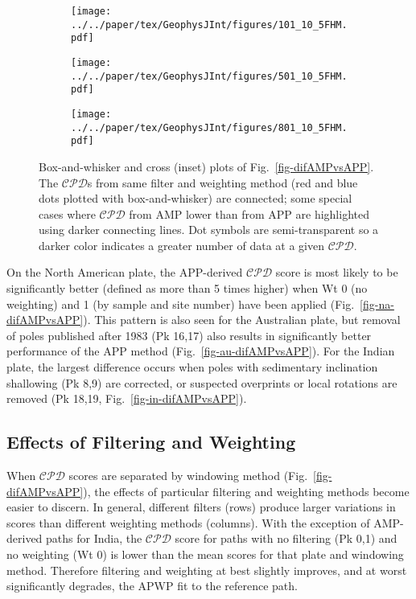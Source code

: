 \begin{figure}
	\centering
	\begin{subfigure}{.9\textwidth}
		\texttt{[image: ../../paper/tex/GeophysJInt/figures/101\_10\_5FHM.pdf]}
		\caption{}\label{fig-na-boxAMPvsAPP}
	\end{subfigure}
	\vspace{.1em}
	\begin{subfigure}{.9\textwidth}
		\texttt{[image: ../../paper/tex/GeophysJInt/figures/501\_10\_5FHM.pdf]}
		\caption{}\label{fig-in-boxAMPvsAPP}
	\end{subfigure}
	\vspace{.1em}
	\begin{subfigure}{.9\textwidth}
		\texttt{[image: ../../paper/tex/GeophysJInt/figures/801\_10\_5FHM.pdf]}
		\caption{}\label{fig-au-boxAMPvsAPP}
	\end{subfigure}
	\caption[]{Box-and-whisker and cross (inset) plots of
Fig.~\ref{fig-difAMPvsAPP}. The $\mathcal{CPD}$s from same filter and weighting
method (red and blue dots plotted with box-and-whisker) are connected; some
special cases where $\mathcal{CPD}$ from AMP lower than from APP are highlighted
using darker connecting lines. Dot symbols are semi-transparent so a darker
color indicates a greater number of data at a given
$\mathcal{CPD}$.}\label{fig-boxAMPvsAPP}
\end{figure}

On the North American plate, the APP-derived $\mathcal{CPD}$ score is most
likely to be significantly better (defined as more than 5 times higher) when
Wt 0 (no weighting) and 1 (by sample and site number) have been
applied (Fig.~\ref{fig-na-difAMPvsAPP}). This pattern is also seen for the
Australian plate, but removal of poles published after 1983 (Pk 16,17) also
results in significantly better performance of the APP method
(Fig.~\ref{fig-au-difAMPvsAPP}). For the Indian plate, the largest difference
occurs when poles with sedimentary inclination shallowing (Pk 8,9) are
corrected, or suspected overprints or local rotations are removed (Pk
18,19, Fig.~\ref{fig-in-difAMPvsAPP}).

\subsection{Effects of Filtering and Weighting}

When $\mathcal{CPD}$ scores are separated by windowing method
(Fig.~\ref{fig-difAMPvsAPP}), the effects of particular filtering and weighting
methods become easier to discern. In general, different filters (rows) produce
larger variations in scores than different weighting methods (columns). With
the exception of AMP-derived paths for India, the $\mathcal{CPD}$ score for
paths with no filtering (Pk 0,1) and no weighting (Wt
0) is lower than the mean scores for that plate and windowing method. Therefore
filtering and weighting at best slightly improves, and at worst significantly
degrades, the APWP fit to the reference path.

